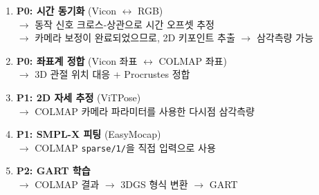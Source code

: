 \documentclass[11pt, a4paper]{report}
\begin{document}
\begin{nextbox}
\begin{enumerate}[leftmargin=*]
  \item \textbf{P0: 시간 동기화} (Vicon $\leftrightarrow$ RGB)\\
    $\rightarrow$ 동작 신호 크로스-상관으로 시간 오프셋 추정\\
    $\rightarrow$ 카메라 보정이 완료되었으므로, 2D 키포인트 추출 $\rightarrow$ 삼각측량 가능

  \item \textbf{P0: 좌표계 정합} (Vicon 좌표 $\leftrightarrow$ COLMAP 좌표)\\
    $\rightarrow$ 3D 관절 위치 대응 + Procrustes 정합

  \item \textbf{P1: 2D 자세 추정} (ViTPose)\\
    $\rightarrow$ COLMAP 카메라 파라미터를 사용한 다시점 삼각측량

  \item \textbf{P1: SMPL-X 피팅} (EasyMocap)\\
    $\rightarrow$ COLMAP \texttt{sparse/1/}을 직접 입력으로 사용

  \item \textbf{P2: GART 학습}\\
    $\rightarrow$ COLMAP 결과 $\rightarrow$ 3DGS 형식 변환 $\rightarrow$ GART
\end{enumerate}
\end{nextbox}
\end{document}
